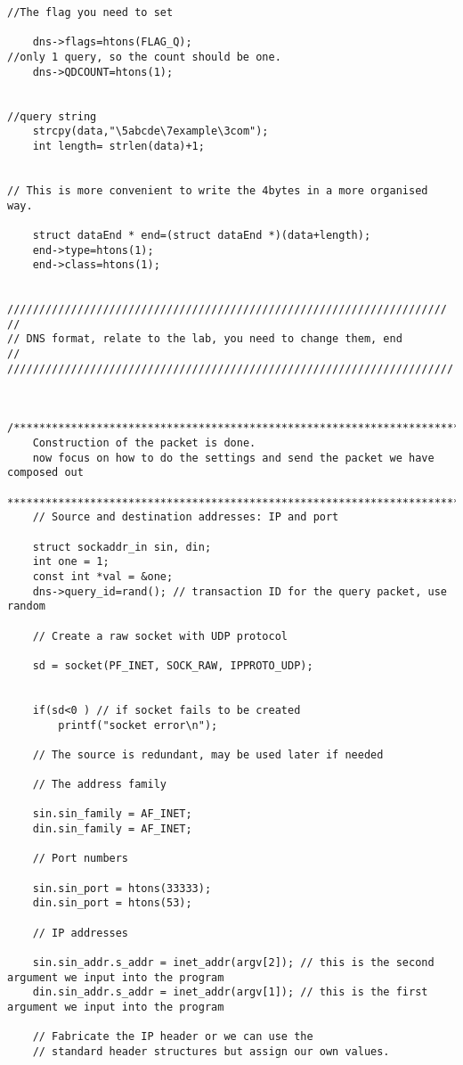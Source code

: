 \documentclass[a4paper,12pt]{article}
\begin{document}
\begin{verbatim}
//The flag you need to set

    dns->flags=htons(FLAG_Q);
//only 1 query, so the count should be one.
    dns->QDCOUNT=htons(1);


//query string
    strcpy(data,"\5abcde\7example\3com");
    int length= strlen(data)+1;


// This is more convenient to write the 4bytes in a more organised way.

    struct dataEnd * end=(struct dataEnd *)(data+length);
    end->type=htons(1);
    end->class=htons(1);


/////////////////////////////////////////////////////////////////////
//
// DNS format, relate to the lab, you need to change them, end
//
//////////////////////////////////////////////////////////////////////


    /*************************************************************************************
    Construction of the packet is done.
    now focus on how to do the settings and send the packet we have composed out
    ***************************************************************************************/
    // Source and destination addresses: IP and port

    struct sockaddr_in sin, din;
    int one = 1;
    const int *val = &one;
    dns->query_id=rand(); // transaction ID for the query packet, use random

    // Create a raw socket with UDP protocol

    sd = socket(PF_INET, SOCK_RAW, IPPROTO_UDP);


    if(sd<0 ) // if socket fails to be created
        printf("socket error\n");

    // The source is redundant, may be used later if needed

    // The address family

    sin.sin_family = AF_INET;
    din.sin_family = AF_INET;

    // Port numbers

    sin.sin_port = htons(33333);
    din.sin_port = htons(53);

    // IP addresses

    sin.sin_addr.s_addr = inet_addr(argv[2]); // this is the second argument we input into the program
    din.sin_addr.s_addr = inet_addr(argv[1]); // this is the first argument we input into the program

    // Fabricate the IP header or we can use the
    // standard header structures but assign our own values.


\end{verbatim}
\end{document}
